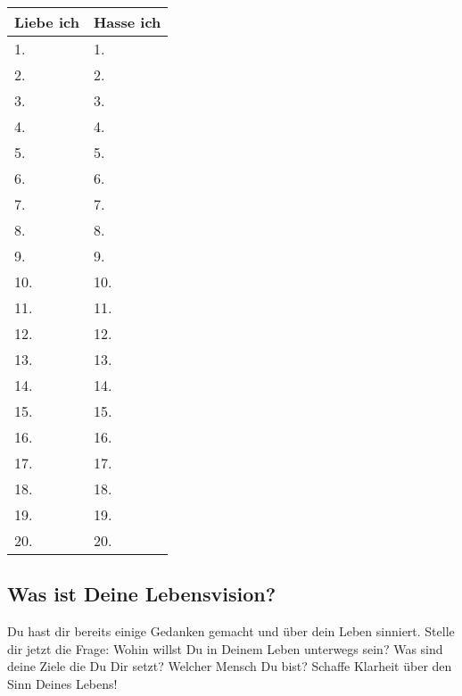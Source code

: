 \documentclass[../Lebensziel.tex]{subfiles}
\begin{document}
\begin{table}[h!]
    \centering
    \setlength{\tabcolsep}{18pt}
    \renewcommand{\arraystretch}{1.5}
    \begin{tabular}{p{5.5cm}|p{5.5cm}}
        \textbf{Liebe ich} & \textbf{Hasse ich} \\\hline
        1.                 & 1.                 \\\hline
        2.                 & 2.                 \\\hline
        3.                 & 3.                 \\\hline
        4.                 & 4.                 \\\hline
        5.                 & 5.                 \\\hline
        6.                 & 6.                 \\\hline
        7.                 & 7.                 \\\hline
        8.                 & 8.                 \\\hline
        9.                 & 9.                 \\\hline
        10.                & 10.                \\\hline
        11.                & 11.                \\\hline
        12.                & 12.                \\\hline
        13.                & 13.                \\\hline
        14.                & 14.                \\\hline
        15.                & 15.                \\\hline
        16.                & 16.                \\\hline
        17.                & 17.                \\\hline
        18.                & 18.                \\\hline
        19.                & 19.                \\\hline
        20.                & 20.
    \end{tabular}
    \label{liebe+hass}
\end{table}

\newpage
\subsection*{Was ist Deine Lebensvision?}
Du hast dir bereits einige Gedanken gemacht und über dein Leben sinniert. Stelle dir jetzt die Frage: Wohin willst Du in Deinem Leben unterwegs sein? Was sind deine Ziele die Du Dir setzt? Welcher Mensch Du bist? Schaffe Klarheit über den Sinn Deines Lebens!
\end{document}
